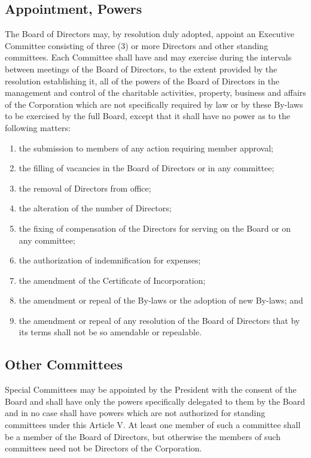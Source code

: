 \documentclass{article}
\begin{document}
\subsection{Appointment, Powers}
The Board of Directors may, by resolution duly adopted, appoint an Executive Committee consisting of three (3) or more Directors and other standing committees.  Each Committee shall have and may exercise during the intervals between meetings of the Board of Directors, to the extent provided by the resolution establishing it, all of the powers of the Board of Directors in the management and control of the charitable activities, property, business and affairs of the Corporation which are not specifically required by law or by these By-laws to be exercised by the full Board, except that it shall have no power as to the following matters:
\renewcommand{\labelenumi}{\alph{enumi}$)$}
\begin{enumerate}
\item the submission to members of any action requiring member approval;
\item the filling of vacancies in the Board of Directors or in any committee;
\item the removal of Directors from office;
\item the alteration of the number of Directors;
\item the fixing of compensation of the Directors for serving on the Board or on any committee;
\item the authorization of indemnification for expenses;
\item the amendment of the Certificate of Incorporation;
\item the amendment or repeal of the By-laws or the adoption of new By-laws; and
\item the amendment or repeal of any resolution of the Board of Directors that by its terms shall not be so amendable or repealable.
\end{enumerate}
\subsection{Other Committees}
Special Committees may be appointed by the President with the consent of the Board and shall have only the powers specifically delegated to them by the Board and in no case shall have powers which are not authorized for standing committees under this Article V.  At least one member of such a committee shall be a member of the Board of Directors, but otherwise the members of such committees need not be Directors of the Corporation.
\end{document}
